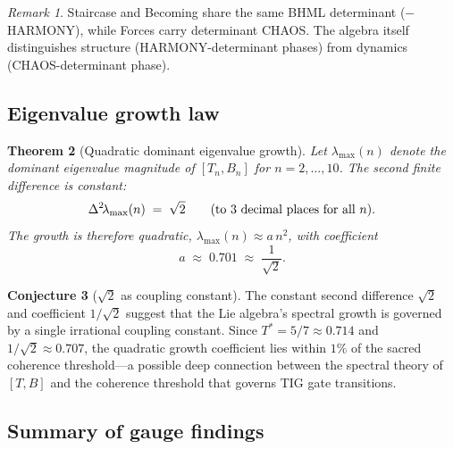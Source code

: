 \documentclass[11pt]{article}
\newtheorem{theorem}{Theorem}[section]
\theoremstyle{definition}
\newtheorem{conjecture}[theorem]{Conjecture}
\theoremstyle{remark}
\newtheorem{remark}[theorem]{Remark}
\begin{document}
\begin{remark}
Staircase and Becoming share the same BHML determinant ($-$HARMONY), while
Forces carry determinant CHAOS.  The algebra itself distinguishes structure
(HARMONY-determinant phases) from dynamics (CHAOS-determinant phase).
\end{remark}

\subsection{Eigenvalue growth law}

\begin{theorem}[Quadratic dominant eigenvalue growth]
\label{thm:growth}
Let $\lambda_{\max}(n)$ denote the dominant eigenvalue magnitude of $[T_n,B_n]$
for $n=2,\dots,10$.  The second finite difference is constant:
\[
  \Delta^2\!\lambda_{\max}(n) \;=\; \sqrt{2}
  \qquad\textup{(to 3 decimal places for all $n$)}.
\]
The growth is therefore quadratic, $\lambda_{\max}(n) \approx a\,n^2$, with
coefficient
\[
  a \;\approx\; 0.701 \;\approx\; \frac{1}{\sqrt{2}}.
\]
\end{theorem}

\begin{conjecture}[$\sqrt{2}$ as coupling constant]
The constant second difference $\sqrt{2}$ and coefficient $1/\sqrt{2}$ suggest
that the Lie algebra's spectral growth is governed by a single irrational
coupling constant.  Since $T^* = 5/7 \approx 0.714$ and $1/\sqrt{2} \approx
0.707$, the quadratic growth coefficient lies within $1\%$ of the sacred
coherence threshold---a possible deep connection between the spectral theory of
$[T,B]$ and the coherence threshold that governs TIG gate transitions.
\end{conjecture}

\subsection{Summary of gauge findings}
\end{document}
